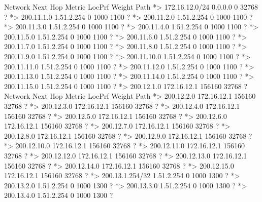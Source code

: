 \documentclass[10pt]{article}
\begin{document}
\begin{itemize}
\begin{verbatim*}
		   Network          Next Hop            Metric LocPrf Weight Path
		*> 172.16.12.0/24   0.0.0.0                  0         32768 ?
		*> 200.11.1.0       1.51.2.254                             0 1000 1100 ?
		*> 200.11.2.0       1.51.2.254                             0 1000 1100 ?
		*> 200.11.3.0       1.51.2.254                             0 1000 1100 ?
		*> 200.11.4.0       1.51.2.254                             0 1000 1100 ?
		*> 200.11.5.0       1.51.2.254                             0 1000 1100 ?
		*> 200.11.6.0       1.51.2.254                             0 1000 1100 ?
		*> 200.11.7.0       1.51.2.254                             0 1000 1100 ?
		*> 200.11.8.0       1.51.2.254                             0 1000 1100 ?
		*> 200.11.9.0       1.51.2.254                             0 1000 1100 ?
		*> 200.11.10.0      1.51.2.254                             0 1000 1100 ?
		*> 200.11.11.0      1.51.2.254                             0 1000 1100 ?
		*> 200.11.12.0      1.51.2.254                             0 1000 1100 ?
		*> 200.11.13.0      1.51.2.254                             0 1000 1100 ?
		*> 200.11.14.0      1.51.2.254                             0 1000 1100 ?
		*> 200.11.15.0      1.51.2.254                             0 1000 1100 ?
		*> 200.12.1.0       172.16.12.1         156160         32768 ?
		   Network          Next Hop            Metric LocPrf Weight Path
		*> 200.12.2.0       172.16.12.1         156160         32768 ?
		*> 200.12.3.0       172.16.12.1         156160         32768 ?
		*> 200.12.4.0       172.16.12.1         156160         32768 ?
		*> 200.12.5.0       172.16.12.1         156160         32768 ?
		*> 200.12.6.0       172.16.12.1         156160         32768 ?
		*> 200.12.7.0       172.16.12.1         156160         32768 ?
		*> 200.12.8.0       172.16.12.1         156160         32768 ?
		*> 200.12.9.0       172.16.12.1         156160         32768 ?
		*> 200.12.10.0      172.16.12.1         156160         32768 ?
		*> 200.12.11.0      172.16.12.1         156160         32768 ?
		*> 200.12.12.0      172.16.12.1         156160         32768 ?
		*> 200.12.13.0      172.16.12.1         156160         32768 ?
		*> 200.12.14.0      172.16.12.1         156160         32768 ?
		*> 200.12.15.0      172.16.12.1         156160         32768 ?
		*> 200.13.1.254/32  1.51.2.254                             0 1000 1300 ?
		*> 200.13.2.0       1.51.2.254                             0 1000 1300 ?
		*> 200.13.3.0       1.51.2.254                             0 1000 1300 ?
		*> 200.13.4.0       1.51.2.254                             0 1000 1300 ?

\end{verbatim*}
\end{itemize}
\end{document}
